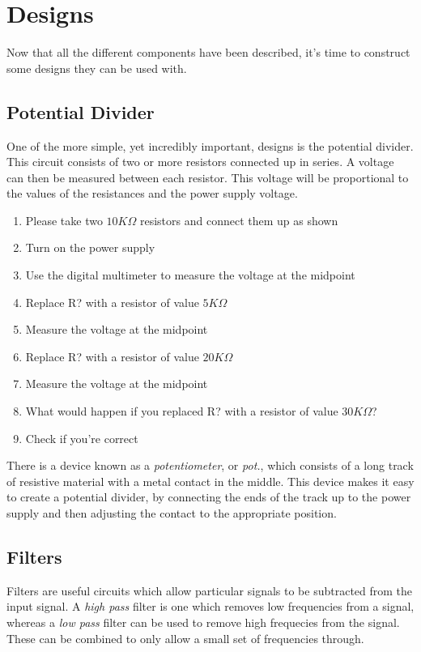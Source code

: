 \section{Designs}
Now that all the different components have been described, it's time to construct some designs they can be used with.

\subsection{Potential Divider}
One of the more simple, yet incredibly important, designs is the potential divider.
This circuit consists of two or more resistors connected up in series.
A voltage can then be measured between each resistor.
This voltage will be proportional to the values of the resistances and the power supply voltage.

\begin{enumerate}
\item Please take two $10K\Omega$ resistors and connect them up as shown
\item Turn on the power supply
\item Use the digital multimeter to measure the voltage at the midpoint
\item Replace R? with a resistor of value $5K\Omega$
\item Measure the voltage at the midpoint
\item Replace R? with a resistor of value $20K\Omega$
\item Measure the voltage at the midpoint
\item What would happen if you replaced R? with a resistor of value $30K\Omega$?
\item Check if you're correct
\end{enumerate}

There is a device known as a \emph{potentiometer}, or \emph{pot.}, which consists of a long track of resistive material with a metal contact in the middle.
This device makes it easy to create a potential divider, by connecting the ends of the track up to the power supply and then adjusting the contact to the appropriate position.

\subsection{Filters}
Filters are useful circuits which allow particular signals to be subtracted from the input signal.
A \emph{high pass} filter is one which removes low frequencies from a signal, whereas a \emph{low pass} filter can be used to remove high frequecies from the signal.
These can be combined to only allow a small set of frequencies through.

